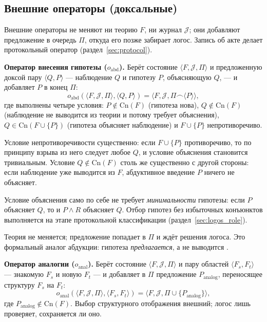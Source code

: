 \documentclass[12pt,a4paper]{article}
\begin{document}
\subsection{Внешние операторы (доксальные)}
\label{sec:external}

Внешние операторы не меняют ни теорию $F$, ни журнал $\mathcal{J}$; они
добавляют предложение в очередь $\Pi$, откуда его позже забирает логос.
Запись об акте делает протокольный оператор (раздел~\ref{sec:protocol}).

\textbf{Оператор внесения гипотезы ($o_{\text{abd}}$).} Берёт состояние
$\langle F, \mathcal{J}, \Pi \rangle$ и предложенную доксой пару
$\langle Q, P \rangle$ --- наблюдение $Q$ и гипотезу $P$, объясняющую
$Q$, --- и добавляет $P$ в конец $\Pi$:
\[
o_{\text{abd}}(\langle F, \mathcal{J}, \Pi \rangle, \langle Q, P \rangle)
= \langle F, \mathcal{J}, \Pi \frown \langle P \rangle \rangle,
\]
где выполнены четыре условия: $P \notin \mathrm{Cn}(F)$ (гипотеза нова),
$Q \notin \mathrm{Cn}(F)$ (наблюдение не выводится из теории и потому
требует объяснения), $Q \in \mathrm{Cn}(F \cup \{P\})$ (гипотеза
объясняет наблюдение) и $F \cup \{P\}$ непротиворечиво.

Условие непротиворечивости существенно: если $F \cup \{P\}$ противоречиво,
то по принципу взрыва из него следует любое $Q$, и условие объяснения
становится тривиальным. Условие $Q \notin \mathrm{Cn}(F)$ столь же
существенно с другой стороны: если наблюдение уже выводится из $F$,
абдуктивное введение $P$ ничего не объясняет.

Условие объяснения само по себе не требует \emph{минимальности} гипотезы:
если $P$ объясняет $Q$, то и $P \land R$ объясняет $Q$. Отбор гипотез
без избыточных конъюнктов выполняется на этапе протокольной классификации
(раздел~\ref{sec:logos_role}).

Теория не меняется; предложение попадает в $\Pi$ и ждёт решения логоса.
Это формальный аналог абдукции: гипотеза \emph{предлагается}, а не
выводится \cite{kakas}.

\textbf{Оператор аналогии ($o_{\text{anal}}$).} Берёт состояние
$\langle F, \mathcal{J}, \Pi \rangle$ и пару областей
$\langle F_s, F_t \rangle$ --- знакомую $F_s$ и новую $F_t$ --- и добавляет
в $\Pi$ предложение $P_{\text{analog}}$, переносящее структуру $F_s$ на
$F_t$:
\[
o_{\text{anal}}(\langle F, \mathcal{J}, \Pi \rangle, \langle F_s, F_t \rangle)
= \langle F, \mathcal{J}, \Pi \cup \{P_{\text{analog}}\} \rangle,
\]
где $P_{\text{analog}} \notin \mathrm{Cn}(F)$. Выбор структурного
отображения внешний; логос лишь проверяет, сохраняется ли оно.
\end{document}
